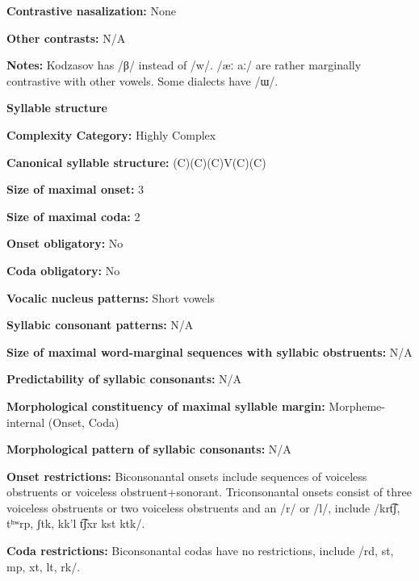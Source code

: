 \textbf{Contrastive nasalization:} None



\textbf{Other contrasts:} N/A



\textbf{Notes:} Kodzasov has /β/ instead of /w/. /æː aː/ are rather marginally contrastive with other vowels. Some dialects have /ɯ/.



\textbf{Syllable structure}



\textbf{Complexity Category:} Highly Complex



\textbf{Canonical syllable structure:} (C)(C)(C)V(C)(C) \citep[40-46]{Haspelmath1993}



\textbf{Size of maximal onset:} 3



\textbf{Size of maximal coda:} 2



\textbf{Onset obligatory:} No



\textbf{Coda obligatory:} No



\textbf{Vocalic nucleus patterns:} Short vowels



\textbf{Syllabic consonant patterns:} N/A



\textbf{Size of maximal word{}-marginal sequences with syllabic obstruents:} N/A



\textbf{Predictability of syllabic consonants:} N/A



\textbf{Morphological constituency of maximal syllable margin:} Morpheme-internal (Onset, Coda)



\textbf{Morphological pattern of syllabic consonants:} N/A



\textbf{Onset restrictions:} Biconsonantal onsets include sequences of voiceless obstruents or voiceless obstruent+sonorant. Triconsonantal onsets consist of three voiceless obstruents or two voiceless obstruents and an /r/ or /l/, include /krt͡ʃ, tʰʷrp, ʃtk, kk'l t͡ʃxr kst ktk/.



\textbf{Coda restrictions:} Biconsonantal codas have no restrictions, include /rd, st, mp, xt, lt, rk/.



